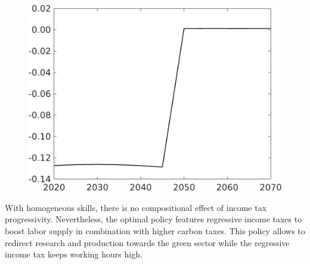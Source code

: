 \begin{figure}[h!!!]
\begin{minipage}[]{0.32\textwidth}
\end{minipage}
\begin{minipage}[]{0.32\textwidth}
\includegraphics[width=1\textwidth]{../../codding_model/own_basedOnFried/optimalPol_010922_revision/figures/all_13Sept22_Tplus30/sn_OPT_COMPtaulPer_regime4_spillover0_knspil1_noskill1_sep0_xgrowth0_PV1_etaa0.79.png}
\end{minipage}
\end{figure} 
With homogeneous skills, there is no compositional effect of income tax progressivity. Nevertheless, the optimal policy features regressive income taxes to boost labor supply in combination with higher carbon taxes. This policy allows to redirect research and production towards the green sector while the regressive income tax keeps working hours high. 

